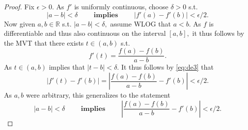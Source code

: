 \documentclass[10pt]{article}
\begin{document}
\begin{proof}
    Fix $\epsilon > 0.$ As $f'$ is uniformly continuous, choose $\delta > 0$ s.t.
    \begin{equation} \label{eq:de3}
        |a-b|<\delta\qquad\textbf{ implies }\qquad|f'(a)-f'(b)|<\epsilon/2.
    \end{equation}
    Now given $a,b\in\mathbb{R}$ s.t. $|a-b|<\delta,$ assume WLOG that $a<b.$ 
    As $f$ is differentiable and thus also continuous on the interval $[a,b],$ it thus follows by the MVT that there exists $t\in(a,b)$ s.t. \[f'(t)=\frac{f(a)-f(b)}{a-b}.\]
    As $t\in(a,b)$ implies that $|t-b|<\delta.$ It thus follows by \eqref{eq:de3} that
    \begin{equation*}
        |f'(t)-f'(b)|=\left |\frac{f(a)-f(b)}{a-b} - f'(b) \right | < \epsilon/2.
    \end{equation*}
    As $a,b$ were arbitrary, this generalizes to the statement
    \begin{equation} \label{eq:de4}
        |a-b|<\delta\qquad\textbf{ implies }\qquad\left |\frac{f(a)-f(b)}{a-b}-f'(b)\right |<\epsilon/2.
    \end{equation}


\end{proof}
\end{document}

